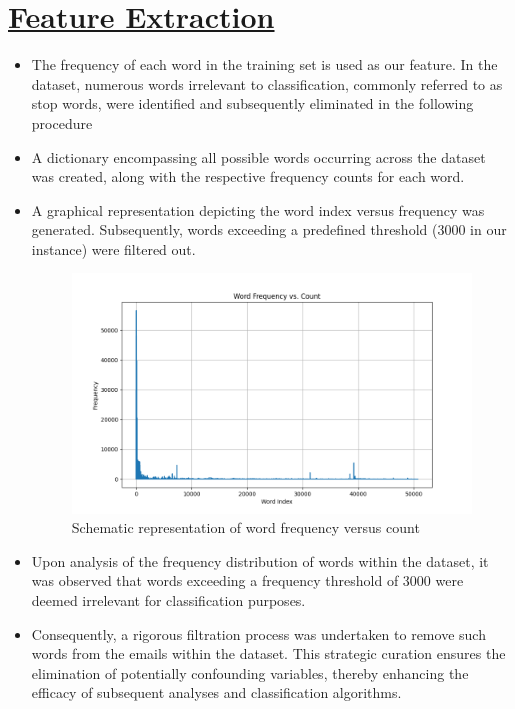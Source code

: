 \documentclass[12pt, a4paper]{article}
\newcommand{\ulsection}[1]{\texorpdfstring{\uline{#1}}{#1}}
\begin{document}
\section{\ulsection{Feature Extraction}}
\begin{itemize}
    \item \large The frequency of each word in the training set is used as our feature. In the dataset, numerous words irrelevant to classification, commonly referred to as stop words, were identified and subsequently eliminated in the following procedure 
    \item \hfuzz=12pt \large A dictionary encompassing all possible words occurring across the dataset was created, along with the respective frequency counts for each word.
    \item \large A graphical representation depicting the word index versus frequency was generated. Subsequently, words exceeding a predefined threshold (3000 in our instance) were filtered out.
    \begin{figure}[ht]
        \centering
        \hfuzz=15pt \includegraphics[width=1.0\textwidth]{word_index_vs_freq}
        \caption{\large Schematic representation of word frequency versus count}
        \label{fig:mesh2}
    \end{figure}
    \item \large Upon analysis of the frequency distribution of words within the dataset, it was observed that words exceeding a frequency threshold of 3000 were deemed irrelevant for classification purposes. 
    \item \large Consequently, a rigorous filtration process was undertaken to remove such words from the emails within the dataset. This strategic curation ensures the elimination of potentially confounding variables, thereby enhancing the efficacy of subsequent analyses and classification algorithms.
\end{itemize}
\newpage
\end{document}
